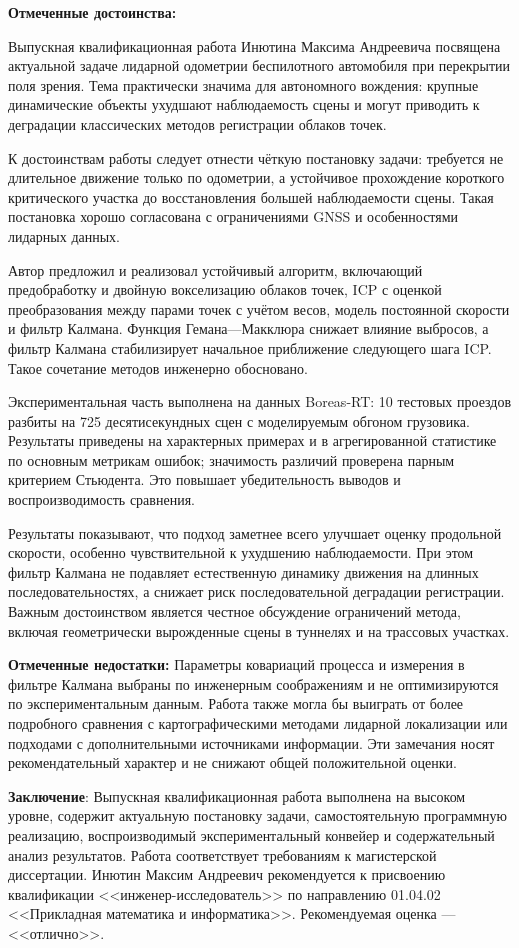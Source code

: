 \documentclass[master, fontsize=12pt]{diploma}
\begin{document}
\fillReviewHeader

\textbf{Отмеченные достоинства:}

Выпускная квалификационная работа Инютина Максима Андреевича посвящена актуальной задаче лидарной одометрии беспилотного автомобиля при перекрытии поля зрения. Тема практически значима для автономного вождения: крупные динамические объекты ухудшают наблюдаемость сцены и могут приводить к деградации классических методов регистрации облаков точек.

К достоинствам работы следует отнести чёткую постановку задачи: требуется не длительное движение только по одометрии, а устойчивое прохождение короткого критического участка до восстановления большей наблюдаемости сцены. Такая постановка хорошо согласована с ограничениями GNSS и особенностями лидарных данных.

Автор предложил и реализовал устойчивый алгоритм, включающий предобработку и двойную вокселизацию облаков точек, ICP с оценкой преобразования между парами точек с учётом весов, модель постоянной скорости и фильтр Калмана. Функция Гемана---Макклюра снижает влияние выбросов, а фильтр Калмана стабилизирует начальное приближение следующего шага ICP. Такое сочетание методов инженерно обосновано.

Экспериментальная часть выполнена на данных Boreas-RT: 10 тестовых проездов разбиты на 725 десятисекундных сцен с моделируемым обгоном грузовика. Результаты приведены на характерных примерах и в агрегированной статистике по основным метрикам ошибок; значимость различий проверена парным критерием Стьюдента. Это повышает убедительность выводов и воспроизводимость сравнения.

Результаты показывают, что подход заметнее всего улучшает оценку продольной скорости, особенно чувствительной к ухудшению наблюдаемости. При этом фильтр Калмана не подавляет естественную динамику движения на длинных последовательностях, а снижает риск последовательной деградации регистрации. Важным достоинством является честное обсуждение ограничений метода, включая геометрически вырожденные сцены в туннелях и на трассовых участках.

\textbf{Отмеченные недостатки:} Параметры ковариаций процесса и измерения в фильтре Калмана выбраны по инженерным соображениям и не оптимизируются по экспериментальным данным. Работа также могла бы выиграть от более подробного сравнения с картографическими методами лидарной локализации или подходами с дополнительными источниками информации. Эти замечания носят рекомендательный характер и не снижают общей положительной оценки.

\textbf{Заключение}: Выпускная квалификационная работа выполнена на высоком уровне, содержит актуальную постановку задачи, самостоятельную программную реализацию, воспроизводимый экспериментальный конвейер и содержательный анализ результатов. Работа соответствует требованиям к магистерской диссертации. Инютин Максим Андреевич рекомендуется к присвоению квалификации <<инженер-исследователь>> по направлению 01.04.02 <<Прикладная математика и информатика>>. Рекомендуемая оценка --- <<отлично>>.

\makeReviewSignature
\end{document}
